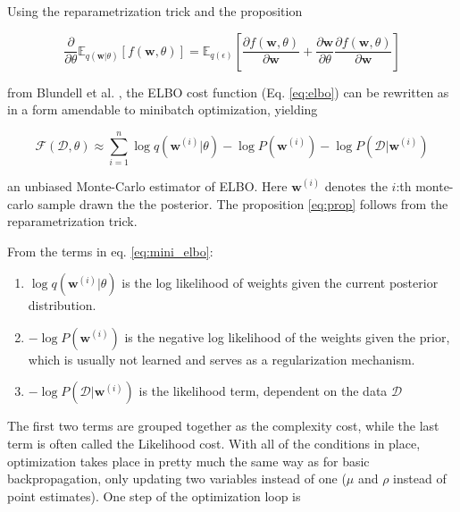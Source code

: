 	Using the reparametrization trick and the proposition
	
	\begin{equation}
	\label{eq:prop}
	\frac{\partial}{\partial \theta} \mathbb{E}_{q(\pmb{w}|\theta)}[f(\pmb{w}, \theta)] =
	\mathbb{E}_{q(\epsilon)}[\frac{\partial f(\pmb{w}, \theta)}{\partial \pmb{w}} + \frac{\partial \pmb{w}}{\partial \theta}
	\frac{\partial f(\pmb{w}, \theta)}{\partial \pmb{w}}]
	\end{equation}
	
	from Blundell et al. \cite{blundell_weight_2015}, the ELBO cost function (Eq. \ref{eq:elbo}) can be rewritten as in a form amendable to minibatch optimization, yielding
	
	\begin{equation}
	\label{eq:mini_elbo}
	\mathcal{F}(\mathcal{D}, \theta) \approx \sum_{i=1}^{n}\log q(\pmb{w}^{(i)}|\theta) - \log P(\pmb{w}^{(i)}) - \log P(\mathcal{D}|\pmb{w}^{(i)})
	\end{equation}
	
	an unbiased Monte-Carlo estimator of ELBO. Here $\pmb{w}^{(i)}$ denotes the $i$:th monte-carlo sample drawn the the posterior. The proposition \ref{eq:prop} follows from the reparametrization trick.
	
	From the terms in eq. \ref{eq:mini_elbo}:
	\begin{enumerate}
		\item $\log q(\pmb{w}^{(i)}|\theta)$ is the log likelihood of weights given the current posterior distribution.
		
		\item $-\log P(\pmb{w}^{(i)})$ is the negative log likelihood of the weights given the prior, which is usually not learned and serves as a regularization mechanism. 
		
		\item $- \log P(\mathcal{D}|\pmb{w}^{(i)})$ is the likelihood term, dependent on the data $\mathcal{D}$
	\end{enumerate}
	
	\vspace*{2mm}
	The first two terms are grouped together as the complexity cost, while the last term is often called the Likelihood cost. With all of the conditions in place, optimization takes place in pretty much the same way as for basic backpropagation, only updating two variables instead of one ($\mu$ and $\rho$ instead of point estimates). One step of the optimization loop is 
	
